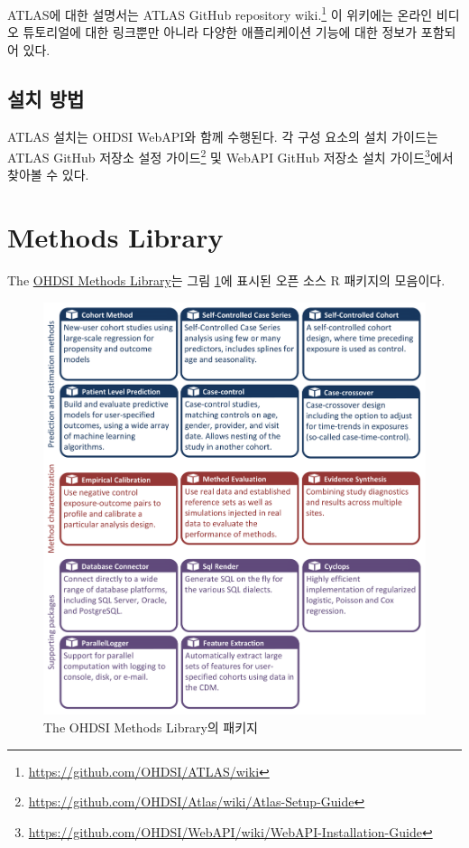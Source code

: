 \documentclass[11pt]{book}
\let\rmarkdownfootnote\footnote%
\def\footnote{\protect\rmarkdownfootnote}
\theoremstyle{definition}
\theoremstyle{definition}
\theoremstyle{definition}
\theoremstyle{remark}
\begin{document}
ATLAS에 대한 설명서는 ATLAS GitHub repository wiki.\footnote{\url{https://github.com/OHDSI/ATLAS/wiki}}
이 위키에는 온라인 비디오 튜토리얼에 대한 링크뿐만 아니라 다양한
애플리케이션 기능에 대한 정보가 포함되어 있다.

\subsection{설치 방법}\label{-}

ATLAS 설치는 OHDSI WebAPI와 함께 수행된다. 각 구성 요소의 설치 가이드는
ATLAS GitHub 저장소 설정 가이드\footnote{\url{https://github.com/OHDSI/Atlas/wiki/Atlas-Setup-Guide}}
및 WebAPI GitHub 저장소 설치 가이드\footnote{\url{https://github.com/OHDSI/WebAPI/wiki/WebAPI-Installation-Guide}}에서
찾아볼 수 있다. 

\section{Methods Library}\label{methods-library}

The \href{https://ohdsi.github.io/MethodsLibrary/}{OHDSI Methods
Library}는 그림 \ref{fig:methodsLibrary}에 표시된 오픈 소스 R 패키지의
모음이다. 

\begin{figure}

{\centering \includegraphics[width=1\linewidth]{images/OhdsiAnalyticsTools/methodsLibrary} 

}

\caption{The OHDSI Methods Library의 패키지}\label{fig:methodsLibrary}
\end{figure}
\end{document}
